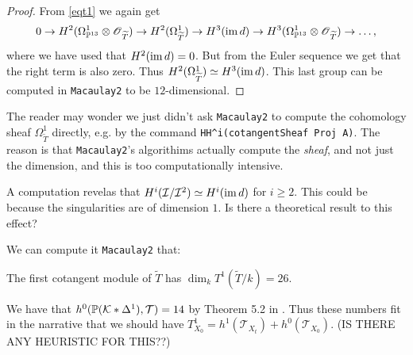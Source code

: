 \documentclass[11pt, english]{article}
\begin{document}
\begin{proof}
From \eqref{eqt1} we again get 
\[
0 \to H^2(\Omega_{\mathbb{P}^{13}}^1 \otimes \operatorname{\mathscr{O}}_{\widetilde T}) \to H^2(\Omega_{\widetilde T}^1) \to H^3(\operatorname{im} d) \to H^3(\Omega_{\mathbb{P}^{13}}^1 \otimes \operatorname{\mathscr{O}}_{\widetilde T}) \to \ldots ,
\]
where we have used that $H^2(\operatorname{im} d)=0$. But from the Euler sequence we get that the right term is also zero. Thus $H^2(\Omega_{\widetilde T}^1) \simeq H^3(\operatorname{im} d)$. This last group can be computed in \verb|Macaulay2| to be $12$-dimensional. 
\end{proof}

\begin{remark}
 The reader may wonder we just didn't ask \verb|Macaulay2| to compute the cohomology sheaf $\Omega_{\widetilde T}^1$ directly, e.g. by the command \verb|HH^i(cotangentSheaf Proj A)|. The reason is that \verb|Macaulay2|'s algorithims actually compute the \emph{sheaf}, and not just the dimension, and this is too computationally intensive.
\end{remark}

\begin{remark}[Question]
A computation revelas that $H^i(\mathcal I/\mathcal I^2) \simeq H^i(\operatorname{im} d)$ for $ i\geq 2$. This could be because the singularities are of dimension $1$. Is there a theoretical result to this effect?
\end{remark}

We can compute it \verb|Macaulay2| that:
\begin{lemma}
The first cotangent module of $\widetilde T$ has $\dim_k T^1(\widetilde T/k) = 26$. 
\end{lemma}

We have that $h^0(\mathbb{P}(\mathcal K \ast \Delta^1),\mathcal T)=14$ by Theorem 5.2 in \cite{deforming_christophersen}. Thus these numbers fit in the narrative that we should have $T^1_{X_0} = h^1(\mathcal T_{X_t}) + h^0(\mathcal T_{X_0})$. (IS THERE ANY HEURISTIC FOR THIS??)

 

\end{document}

